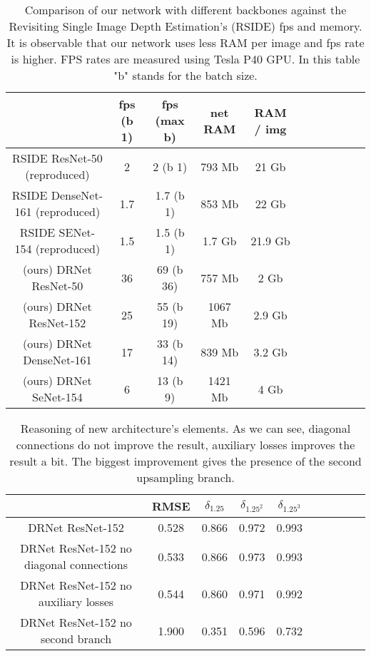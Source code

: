 \documentclass[10pt,twocolumn,letterpaper]{article}
\begin{document}
\begin{table*}
    \begin{center}
    \begin{tabular}{ccccccccccc}
    \hline
    & fps (b 1) & fps (max b) & net RAM & RAM / img \\
    \hline
\hline

\hline
RSIDE ResNet-50 (reproduced) & 2 & 2 (b 1) & 793 Mb & 21 Gb \\
RSIDE DenseNet-161 (reproduced) & 1.7 & 1.7 (b 1) & 853 Mb & 22 Gb  \\
RSIDE SENet-154 (reproduced) & 1.5 & 1.5 (b 1) & 1.7 Gb & 21.9 Gb \\

\hline
(ours) DRNet ResNet-50 & 36 & 69 (b 36) & 757 Mb & 2 Gb\\
(ours) DRNet ResNet-152 & 25 & 55 (b 19) & 1067 Mb & 2.9 Gb \\
(ours) DRNet DenseNet-161 & 17 & 33 (b 14) & 839 Mb & 3.2 Gb \\
(ours) DRNet SeNet-154 & 6 & 13 (b 9) & 1421 Mb & 4 Gb \\
\hline
\end{tabular}
\end{center}
\caption{Comparison of our network with different backbones against the 
Revisiting Single Image Depth Estimation's (RSIDE) \cite{hu2018revisiting} fps and memory. 
It is observable that our network uses less RAM per image and fps rate is higher. 
FPS rates are measured using Tesla P40 GPU. In this table "b" stands for the batch size. }
\label{fig:speed_comparison}
\end{table*}

\begin{table*}
    \begin{center}
    \begin{tabular}{cccccccccc}
    \hline
    & RMSE & $\delta_{1.25}$ & $\delta_{1.25 ^ 2}$ & $\delta_{1.25^3}$ \\
    \hline
\hline

\hline
 DRNet ResNet-152 & 0.528 & 0.866 & 0.972 & 0.993 \\
 DRNet ResNet-152 no diagonal connections & 0.533 & 0.866 & 0.973 & 0.993 \\
 DRNet ResNet-152 no auxiliary losses & 0.544 & 0.860 & 0.971 & 0.992 \\
 DRNet ResNet-152 no second branch & 1.900 & 0.351 & 0.596 & 0.732 \\
\hline
\end{tabular}
\end{center}
\caption{Reasoning of new architecture's elements. As we can see, diagonal connections do not
improve the result, auxiliary losses improves the result a bit.
The biggest improvement gives the presence of the second upsampling branch.}

\label{fig:elements_reasoning}
\end{table*}
\end{document}
